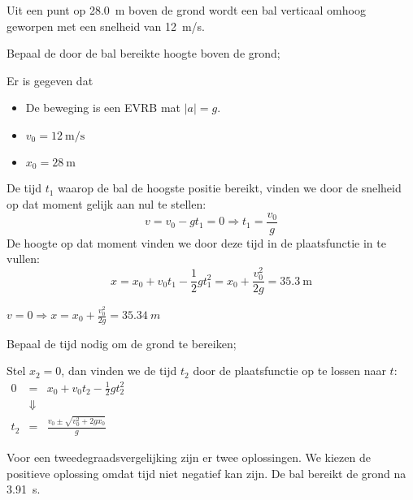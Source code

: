 \documentclass{ximera}
\begin{document}
\begin{exercise}
    Uit een punt op \SI{28,0}{m} boven de grond wordt een bal verticaal omhoog geworpen met een snelheid van \SI{12}{m/s}. 
    \begin{question} Bepaal de door de bal bereikte hoogte boven de grond; 
        \begin{oplossing} 
            Er is gegeven dat 
            \begin{itemize}
                \item De beweging is een EVRB mat \(|a| = g\). 
                \item \(v_0 = \SI{12}{\meter\per\second}\)
                \item \(x_0 = \SI{28}{\meter}\)
            \end{itemize}

            De tijd \(t_1\) waarop de bal de hoogste positie bereikt, vinden we door de snelheid op dat moment gelijk aan nul te stellen:
            \[
            v = v_0 - g t_1 = 0 \Rightarrow t_1 = \frac{v_0}{g} 
            \]
            De hoogte op dat moment vinden we door deze tijd in de plaatsfunctie in te vullen:
            \[
            x = x_0 + v_0 t_1 - \frac{1}{2} g t_1^2 = x_0+\frac{v_0^2}{2g} = \SI{35,3}{\meter}
            \]

            $v=0\Rightarrow x=x_0+\frac{v_0^2}{2g}=\SI{35,34}{m}$ 
        \end{oplossing} 
    \end{question}

    \begin{question} 
        Bepaal de tijd nodig om de grond te bereiken;              
        \begin{oplossing} 

            Stel \(x_2 = 0\), dan vinden we de tijd \(t_2\) door de plaatsfunctie op te lossen naar \(t\):
            \(
            \begin{array}{rcl}
                0 & = & x_0 + v_0 t_2 - \frac{1}{2} g t_2^2 \\
                &\Downarrow& \\
                t_2 & = & \frac{v_0 \pm \sqrt{v_0^2 + 2 g x_0}}{g}
            \end{array}
            \)

            Voor een tweedegraadsvergelijking zijn er twee oplossingen. 
            We kiezen de positieve oplossing omdat tijd niet negatief kan zijn.
            De bal bereikt de grond na \SI{3,91}{\second}.
        \end{oplossing} 
    \end{question}


\end{exercise}
\end{document}
